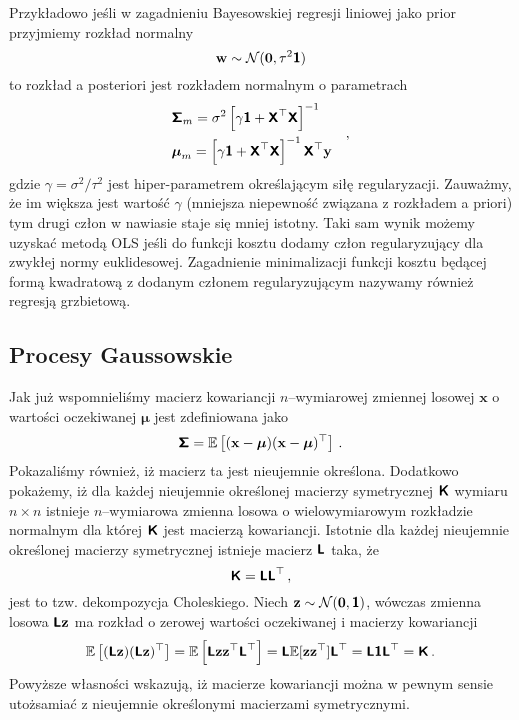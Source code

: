 \documentclass{myclass}
\begin{document}
Przykładowo jeśli w zagadnieniu Bayesowskiej regresji liniowej jako prior przyjmiemy rozkład
normalny
\begin{equation*}
    \mathbf{w} \sim \mathcal{N}(\mathbf{0}, \tau^2\boldsymbol{\mathsf{1}})
\end{equation*}
to rozkład a posteriori jest rozkładem normalnym o parametrach
\begin{equation*}
    \begin{split}
        &\boldsymbol{\mathsf{\Sigma}}_m = \sigma^2 \left[\gamma\boldsymbol{\mathsf{1}} + \boldsymbol{\mathsf{X}}^\top\boldsymbol{\mathsf{X}}\right]^{-1}\\
        &\boldsymbol{\mu}_m = \left[\gamma\boldsymbol{\mathsf{1}} + \boldsymbol{\mathsf{X}}^\top\boldsymbol{\mathsf{X}}\right]^{-1}\boldsymbol{\mathsf{X}}^\top\mathbf{y}
    \end{split}\quad,
\end{equation*}
gdzie \(\gamma = \sigma^2 / \tau^2\) jest hiper-parametrem określającym siłę regularyzacji.
Zauważmy, że im większa jest wartość \(\gamma\) (mniejsza niepewność związana z rozkładem a priori)
tym drugi człon w nawiasie staje się mniej istotny. Taki sam wynik możemy uzyskać metodą OLS jeśli
do funkcji kosztu dodamy człon regularyzujący dla zwykłej normy euklidesowej. Zagadnienie
minimalizacji funkcji kosztu będącej formą kwadratową z dodanym członem regularyzującym nazywamy
również regresją grzbietową.

\subsection{Procesy Gaussowskie}

Jak już wspomnieliśmy macierz kowariancji \(n\)--wymiarowej zmiennej losowej \(\mathbf{x}\) o
wartości oczekiwanej \(\boldsymbol{\mu}\) jest zdefiniowana jako
\begin{equation*}
    \boldsymbol{\mathsf{\Sigma}} = \mathbb{E}\left[(\mathbf{x} - \boldsymbol{\mu})(\mathbf{x} - \boldsymbol{\mu})^\top\right]\,.
\end{equation*}
Pokazaliśmy również, iż macierz ta jest nieujemnie określona. Dodatkowo pokażemy, iż dla każdej
nieujemnie określonej macierzy symetrycznej \(\boldsymbol{\mathsf{K}}\) wymiaru \(n\times n\) istnieje
\(n\)--wymiarowa zmienna losowa o wielowymiarowym rozkładzie normalnym dla której \(\boldsymbol{\mathsf{K}}\) jest
macierzą kowariancji. Istotnie dla każdej nieujemnie określonej macierzy symetrycznej istnieje
macierz \(\boldsymbol{\mathsf{L}}\) taka, że
\begin{equation*}
    \boldsymbol{\mathsf{K}} = \boldsymbol{\mathsf{L}}\boldsymbol{\mathsf{L}}^\top\,,
\end{equation*}
jest to tzw. dekompozycja Choleskiego. Niech \(\mathbf{z} \sim \mathcal{N}(\mathbf{0}, \boldsymbol{\mathsf{1}})\),
wówczas zmienna losowa \(\boldsymbol{\mathsf{L}}\mathbf{z}\) ma rozkład o zerowej wartości oczekiwanej i macierzy
kowariancji
\begin{equation*}
    \mathbb{E}\left[(\boldsymbol{\mathsf{L}}\mathbf{z})(\boldsymbol{\mathsf{L}}\mathbf{z})^\top\right] = \mathbb{E}\left[\boldsymbol{\mathsf{L}}\mathbf{z}\mathbf{z}^\top\boldsymbol{\mathsf{L}}^\top\right] = \boldsymbol{\mathsf{L}}\mathbb{E}[\mathbf{z}\mathbf{z}^\top]\boldsymbol{\mathsf{L}}^\top = \boldsymbol{\mathsf{L}}\boldsymbol{\mathsf{1}}\boldsymbol{\mathsf{L}}^\top = \boldsymbol{\mathsf{K}}\,.
\end{equation*}
Powyższe własności wskazują, iż macierze kowariancji można w pewnym sensie utożsamiać z nieujemnie
określonymi macierzami symetrycznymi.
\end{document}
